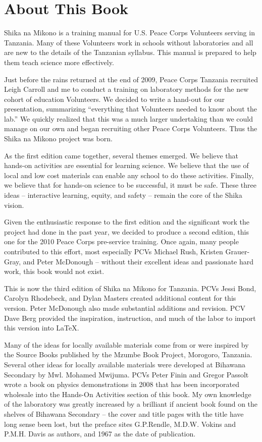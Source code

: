 \chapter{About This Book}

Shika na Mikono is a training manual for U.S. Peace Corps Volunteers serving in Tanzania. Many of these Volunteers work in schools without laboratories and all are new to the details of the Tanzanian syllabus. This manual is prepared to help them teach science more effectively.

Just before the rains returned at the end of 2009, 
Peace Corps Tanzania recruited Leigh Carroll and me 
to conduct a training on laboratory methods 
for the new cohort of education Volunteers. 
We decided to write a hand-out for our presentation, 
summarizing ``everything that Volunteers needed to know about the lab.'' 
We quickly realized that this was a much larger undertaking 
than we could manage on our own 
and began recruiting other Peace Corps Volunteers. 
Thus the Shika na Mikono project was born.

As the first edition came together, several themes emerged. 
We believe that hands-on activities are essential for learning science. 
We believe that the use of local and low cost materials 
can enable any school to do these activities. 
Finally, we believe that for hands-on science to be successful, 
it must be safe. 
These three ideas -- interactive learning, equity, and safety -- 
remain the core of the Shika vision.

Given the enthusiastic response to the first edition 
and the significant work the project had done in the past year, 
we decided to produce a second edition, 
this one for the 2010 Peace Corps pre-service training. 
Once again, many people contributed to this effort, 
most especially PCVs Michael Rush, Kristen Grauer-Gray, and Peter McDonough 
-- without their excellent ideas and passionate hard work, 
this book would not exist.

This is now the third edition of Shika na Mikono for Tanzania.
PCVs Jessi Bond, Carolyn Rhodebeck, and Dylan Masters 
created additional content for this version. Peter McDonough 
also made substantial additions and revision. 
PCV Dave Berg provided the inspiration, instruction, 
and much of the labor to import this version into \LaTeX.

Many of the ideas for locally available materials 
come from or were inspired by the Source Books 
published by the Mzumbe Book Project, Morogoro, Tanzania. 
Several other ideas for locally available materials 
were developed at Bihawana Secondary by Mwl. Mohamed Mwijuma. 
PCVs Peter Finin and Gregor Passolt wrote 
a book on physics demonstrations in 2008 
that has been incorporated wholesale 
into the Hands-On Activities section of this book. 
My own knowledge of the laboratory was greatly increased 
by a brilliant if ancient book found on the shelves of Bihawana Secondary -- 
the cover and title pages with the title have long sense been lost, 
but the preface sites G.P.Rendle, M.D.W. Vokins and P.M.H. Davis as authors, 
and 1967 as the date of publication.

